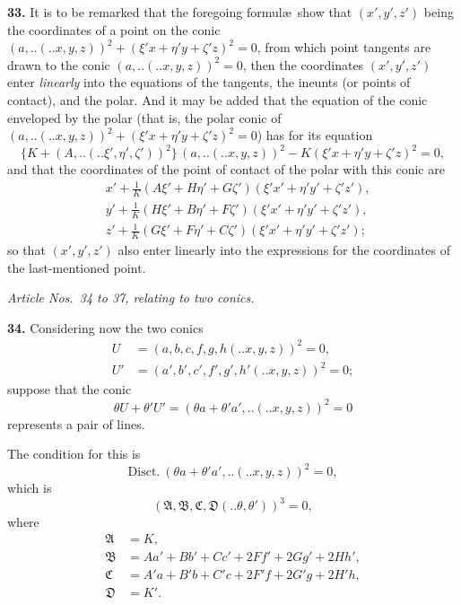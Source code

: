 \documentclass[12pt,a4paper]{article}
\newcommand{\mfA}{\mathfrak{A}}
\newcommand{\mfB}{\mathfrak{B}}
\newcommand{\mfC}{\mathfrak{C}}
\newcommand{\mfD}{\mathfrak{D}}
\newcommand{\qform}[2]{(#1 \mathbin{..} #2)}
\theoremstyle{definition}
\begin{document}
\textbf{33.} It is to be remarked that the foregoing formul\ae\ show that $(x', y', z')$ being the coordinates of a point on the conic $(a,..\!\qform{}{x, y, z})^{2} + (\xi'x + \eta'y + \zeta'z)^{2} = 0$, from which point tangents are drawn to the conic $(a,..\!\qform{}{x, y, z})^{2} = 0$, then the coordinates $(x', y', z')$ enter \textit{linearly} into the equations of the tangents, the ineunts (or points of contact), and the polar. And it may be added that the equation of the conic enveloped by the polar (that is, the polar conic of $(a,..\!\qform{}{x, y, z})^{2} + (\xi'x + \eta'y + \zeta'z)^{2} = 0$) has for its equation
\[
\{K + (A,..\!\qform{}{\xi', \eta', \zeta'})^{2}\}\,(a,..\!\qform{}{x, y, z})^{2} - K(\xi'x + \eta'y + \zeta'z)^{2} = 0,
\]
and that the coordinates of the point of contact of the polar with this conic are
\begin{align*}
&x' + \frac{1}{K}(A\xi' + H\eta' + G\zeta')(\xi'x' + \eta'y' + \zeta'z'),\\
&y' + \frac{1}{K}(H\xi' + B\eta' + F\zeta')(\xi'x' + \eta'y' + \zeta'z'),\\
&z' + \frac{1}{K}(G\xi' + F\eta' + C\zeta')(\xi'x' + \eta'y' + \zeta'z');
\end{align*}
so that $(x', y', z')$ also enter linearly into the expressions for the coordinates of the last-mentioned point.

\medskip
\begin{center}
\textit{Article Nos.\ 34 to 37, relating to two conics.}
\end{center}
\medskip

\textbf{34.} Considering now the two conics
\begin{align*}
U &= (a, b, c, f, g, h \!\qform{}{x, y, z})^{2} = 0,\\
U' &= (a', b', c', f', g', h' \!\qform{}{x, y, z})^{2} = 0;
\end{align*}
suppose that the conic
\[
\theta U + \theta' U' = (\theta a + \theta' a',.. \!\qform{}{x, y, z})^{2} = 0
\]
represents a pair of lines.

The condition for this is
\[
\text{Disct.}\ (\theta a + \theta' a',.. \!\qform{}{x, y, z})^{2} = 0,
\]
which is
\[
(\mfA, \mfB, \mfC, \mfD \!\qform{}{\theta, \theta'})^{3} = 0,
\]
where
\begin{align*}
\mfA &= K,\\
\mfB &= Aa' + Bb' + Cc' + 2Ff' + 2Gg' + 2Hh',\\
\mfC &= A'a + B'b + C'c + 2F'f + 2G'g + 2H'h,\\
\mfD &= K'.
\end{align*}
\end{document}
